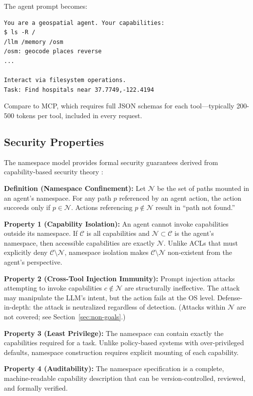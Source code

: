 \documentclass[acmsmall,screen,review]{acmart}
\begin{document}
The agent prompt becomes:

\begin{lstlisting}
You are a geospatial agent. Your capabilities:
$ ls -R /
/llm /memory /osm
/osm: geocode places reverse
...

Interact via filesystem operations.
Task: Find hospitals near 37.7749,-122.4194
\end{lstlisting}

Compare to MCP, which requires full JSON schemas for each tool---typically 200-500 tokens per tool, included in every request.

\subsection{Security Properties}

The namespace model provides formal security guarantees derived from capability-based security theory \cite{miller2006capability}:

\textbf{Definition (Namespace Confinement):} Let $\mathcal{N}$ be the set of paths mounted in an agent's namespace. For any path $p$ referenced by an agent action, the action succeeds only if $p \in \mathcal{N}$. Actions referencing $p \notin \mathcal{N}$ result in ``path not found.''

\textbf{Property 1 (Capability Isolation):} An agent cannot invoke capabilities outside its namespace. If $\mathcal{C}$ is all capabilities and $\mathcal{N} \subset \mathcal{C}$ is the agent's namespace, then accessible capabilities are exactly $\mathcal{N}$. Unlike ACLs that must explicitly deny $\mathcal{C} \setminus \mathcal{N}$, namespace isolation makes $\mathcal{C} \setminus \mathcal{N}$ non-existent from the agent's perspective.

\textbf{Property 2 (Cross-Tool Injection Immunity):} Prompt injection attacks attempting to invoke capabilities $c \notin \mathcal{N}$ are structurally ineffective. The attack may manipulate the LLM's intent, but the action fails at the OS level. Defense-in-depth: the attack is neutralized regardless of detection. (Attacks within $\mathcal{N}$ are not covered; see Section~\ref{sec:non-goals}.)

\textbf{Property 3 (Least Privilege):} The namespace can contain exactly the capabilities required for a task. Unlike policy-based systems with over-privileged defaults, namespace construction requires explicit mounting of each capability.

\textbf{Property 4 (Auditability):} The namespace specification is a complete, machine-readable capability description that can be version-controlled, reviewed, and formally verified.
\end{document}
